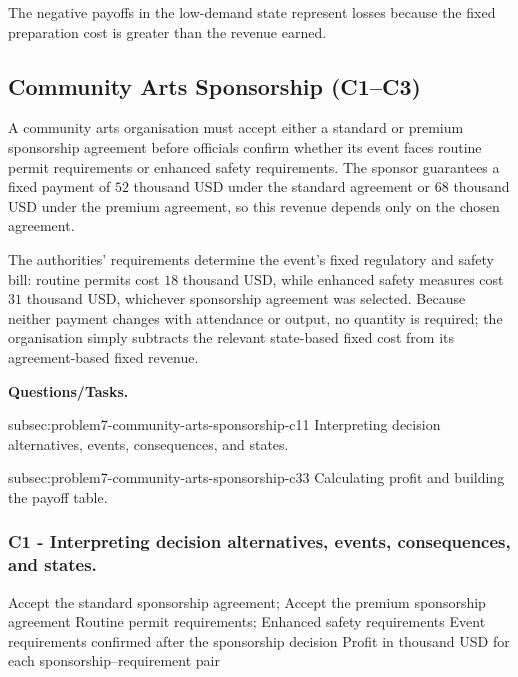	The negative payoffs in the low-demand state represent losses because the
	fixed preparation cost is greater than the revenue earned.



	\subsection{Community Arts Sponsorship (C1--C3)}
	\label{sec:problem7-community-arts-sponsorship-c1-c3}

	A community arts organisation must accept either a standard or premium sponsorship agreement before officials confirm whether its event faces routine permit requirements or enhanced safety requirements. The sponsor guarantees a fixed payment of \(52\) thousand USD under the standard agreement or \(68\) thousand USD under the premium agreement, so this revenue depends only on the chosen agreement.

	The authorities' requirements determine the event's fixed regulatory and safety bill: routine permits cost \(18\) thousand USD, while enhanced safety measures cost \(31\) thousand USD, whichever sponsorship agreement was selected. Because neither payment changes with attendance or output, no quantity is required; the organisation simply subtracts the relevant state-based fixed cost from its agreement-based fixed revenue.

	\textbf{Questions/Tasks.}
	\begin{enumerate}
		\CriterionTask
		{subsec:problem7-community-arts-sponsorship-c1}{1}
		{Interpreting decision alternatives, events, consequences, and states.}

		\CriterionTask
		{subsec:problem7-community-arts-sponsorship-c3}{3}
		{Calculating profit and building the payoff table.}
	\end{enumerate}

	\subsubsection*{C1 - Interpreting decision alternatives, events, consequences, and states.}
	\label{subsec:problem7-community-arts-sponsorship-c1}

	\DecisionElementsTable
	{Accept the standard sponsorship agreement; Accept the premium sponsorship agreement}
	{Routine permit requirements; Enhanced safety requirements}
	{Event requirements confirmed after the sponsorship decision}
	{Profit in thousand USD for each sponsorship--requirement pair}

